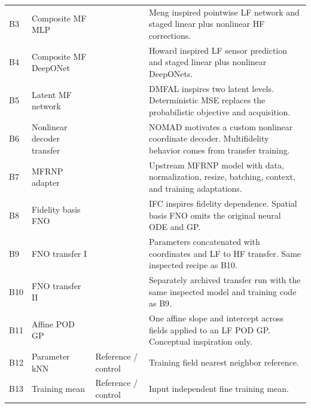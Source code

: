 \begin{tabular}{p{.035\linewidth}p{.22\linewidth}p{.25\linewidth}p{.39\linewidth}}
B3 & Composite MF MLP & \citep{meng2020} & Meng inspired pointwise LF network and staged linear plus nonlinear HF corrections. \\
B4 & Composite MF DeepONet & \citep{howard2023} & Howard inspired LF sensor prediction and staged linear plus nonlinear DeepONets. \\
B5 & Latent MF network & \citep{li2022dmfal} & DMFAL inspires two latent levels. Deterministic MSE replaces the probabilistic objective and acquisition. \\
B6 & Nonlinear decoder transfer & \citep{seidman2022} & NOMAD motivates a custom nonlinear coordinate decoder. Multifidelity behavior comes from transfer training. \\
B7 & MFRNP adapter & \citep{niu2024} & Upstream MFRNP model with data, normalization, resize, batching, context, and training adaptations. \\
B8 & Fidelity basis FNO & \citep{li2022ifc} & IFC inspires fidelity dependence. Spatial basis FNO omits the original neural ODE and GP. \\
B9 & FNO transfer I & \citep{lyu2023} & Parameters concatenated with coordinates and LF to HF transfer. Same inspected recipe as B10. \\
B10 & FNO transfer II & \citep{lyu2023} & Separately archived transfer run with the same inspected model and training code as B9. \\
B11 & Affine POD GP & \citep{zhang2018} & One affine slope and intercept across fields applied to an LF POD GP. Conceptual inspiration only. \\
B12 & Parameter kNN & Reference / control & Training field nearest neighbor reference. \\
B13 & Training mean & Reference / control & Input independent fine training mean. \\
\bottomrule
\end{tabular}
